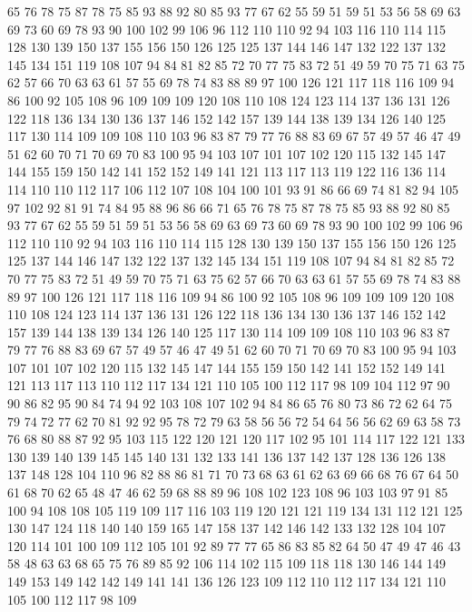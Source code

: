 65 76 78 75 87 78 75 85 93 88 92 80 85 93 77 67 62 55 59 51
59 51 53 56 58 69 63 69 73 60 69 78 93 90 100 102 99 106 96 112
110 110 92 94 103 116 110 114 115 128 130 139 150 137 155 156 150 126 125 125
137 144 146 147 132 122 137 132 145 134 151 119 108 107 94 84 81 82 85 72
70 77 75 83 72 51 49 59 70 75 71 63 75 62 57 66 70 63 63 61
57 55 69 78 74 83 88 89 97 100 126 121 117 118 116 109 94 86 100 92
105 108 96 109 109 109 120 108 110 108 124 123 114 137 136 131 126 122 118 136
134 130 136 137 146 152 142 157 139 144 138 139 134 126 140 125 117 130 114 109
109 108 110 103 96 83 87 79 77 76 88 83 69 67 57 49 57 46 47 49
51 62 60 70 71 70 69 70 83 100 95 94 103 107 101 107 102 120 115 132
145 147 144 155 159 150 142 141 152 152 149 141 121 113 117 113 119 122 116 136
114 114 110 110 112 117 106 112 107 108 104 100 101 93 91 86 66 69 74 81
82 94 105 97 102 92 81 91 74 84 95 88 96 86 66 71 65 76 78 75
87 78 75 85 93 88 92 80 85 93 77 67 62 55 59 51 59 51 53 56
58 69 63 69 73 60 69 78 93 90 100 102 99 106 96 112 110 110 92 94
103 116 110 114 115 128 130 139 150 137 155 156 150 126 125 125 137 144 146 147
132 122 137 132 145 134 151 119 108 107 94 84 81 82 85 72 70 77 75 83
72 51 49 59 70 75 71 63 75 62 57 66 70 63 63 61 57 55 69 78
74 83 88 89 97 100 126 121 117 118 116 109 94 86 100 92 105 108 96 109
109 109 120 108 110 108 124 123 114 137 136 131 126 122 118 136 134 130 136 137
146 152 142 157 139 144 138 139 134 126 140 125 117 130 114 109 109 108 110 103
96 83 87 79 77 76 88 83 69 67 57 49 57 46 47 49 51 62 60 70
71 70 69 70 83 100 95 94 103 107 101 107 102 120 115 132 145 147 144 155
159 150 142 141 152 152 149 141 121 113 117 113 110 112 117 134 121 110 105 100
112 117 98 109 104 112 97 90 90 86 82 95 90 84 74 94 92 103 108 107
102 94 84 86 65 76 80 73 86 72 62 64 75 79 74 72 77 62 70 81
92 92 95 78 72 79 63 58 56 56 72 54 64 56 56 62 69 63 58 73
76 68 80 88 87 92 95 103 115 122 120 121 120 117 102 95 101 114 117 122
121 133 130 139 140 139 145 145 140 131 132 133 141 136 137 142 137 128 136 126
138 137 148 128 104 110 96 82 88 86 81 71 70 73 68 63 61 62 63 69
66 68 76 67 64 50 61 68 70 62 65 48 47 46 62 59 68 88 89 96
108 102 123 108 96 103 103 97 91 85 100 94 108 108 105 119 109 117 116 103
119 120 121 121 119 134 131 112 121 125 130 147 124 118 140 140 159 165 147 158
137 142 146 142 133 132 128 104 107 120 114 101 100 109 112 105 101 92 89 77
77 65 86 83 85 82 64 50 47 49 47 46 43 58 48 63 63 68 65 75
76 89 85 92 106 114 102 115 109 118 118 130 146 144 149 149 153 149 142 142
149 141 141 136 126 123 109 112 110 112 117 134 121 110 105 100 112 117 98 109
